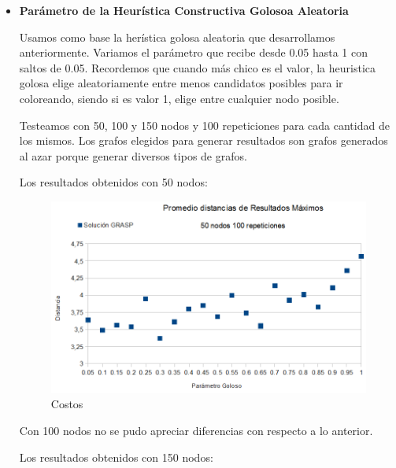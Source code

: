 \begin{itemize}

\item \textbf{Parámetro de la Heurística Constructiva Golosoa Aleatoria}

\quad

\quad Usamos como base la herística golosa aleatoria que desarrollamos anteriormente. Variamos el parámetro que recibe desde 0.05 hasta 1 con saltos de 0.05. Recordemos que cuando más chico es el valor, la heuristica golosa elige aleatoriamente entre menos candidatos posibles para ir coloreando, siendo si es valor 1, elige entre cualquier nodo posible.

\quad Testeamos con 50, 100 y 150 nodos y 100 repeticiones para cada cantidad de los mismos. Los grafos elegidos para generar resultados son grafos generados al azar porque generar diversos tipos de grafos.

\quad

\quad Los resultados obtenidos con 50 nodos:

\begin{figure}[H]
	\centering
	\includegraphics[scale=0.6]{optimizacionGRASPParGoloso1.png}
\caption{Costos}
\end{figure}

\quad

\quad Con 100 nodos no se pudo apreciar diferencias con respecto a lo anterior.

\quad

\quad Los resultados obtenidos con 150 nodos:


\end{itemize}
